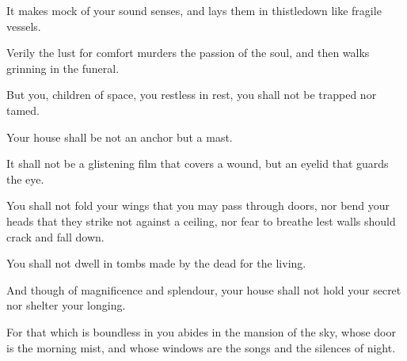 It makes mock of your sound senses, and
lays them in thistledown like fragile
vessels.

Verily the lust for comfort murders
the passion of the soul, and then walks
grinning in the funeral.

But you, children of space, you restless
in rest, you shall not be trapped nor
tamed.

Your house shall be not an anchor but a
mast.

It shall not be a glistening film that
covers a wound, but an eyelid that
guards the eye.

You shall not fold your wings that you
may pass through doors, nor bend your
heads that they strike not against a
ceiling, nor fear to breathe lest walls
should crack and fall down.

You shall not dwell in tombs made by the
dead for the living.

And though of magnificence and
splendour, your house shall not hold
your secret nor shelter your longing.

For that which is boundless in you
abides in the mansion of the sky, whose
door is the morning mist, and whose
windows are the songs and the silences
of night.
